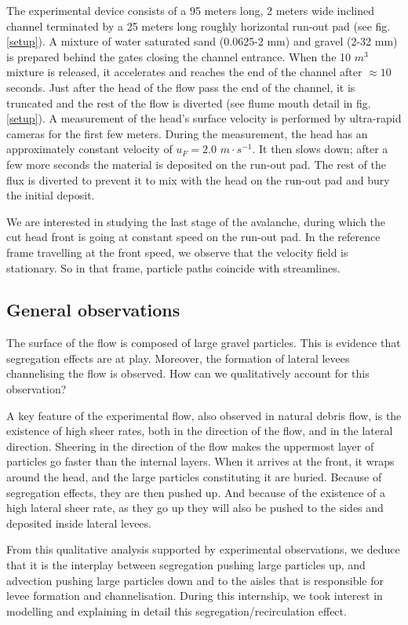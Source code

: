 The experimental device consists of a 95 meters long, 2 meters wide inclined channel terminated by a 25 meters long roughly horizontal run-out pad (see fig. \ref{setup}).
A mixture of water saturated sand (0.0625-2 mm) and gravel (2-32 mm) is prepared behind the gates closing the channel entrance.
When the 10 $m^3$ mixture is released, it accelerates and reaches the end of the channel after $\approx 10$ seconds. 
Just after the head of the flow pass the end of the channel, it is truncated and the rest of the flow is diverted (see flume mouth detail in fig. \ref{setup}).
A measurement of the head's surface velocity is performed by ultra-rapid cameras for the first few meters. During the measurement, the head has an approximately constant velocity of $u_F = 2.0$ $m \cdot s^{-1}$. It then slows down; after a few more seconds the material is deposited on the run-out pad.
The rest of the flux is diverted to prevent it to mix with the head on the run-out pad and bury the initial deposit. 

We are interested in studying the last stage of the avalanche, during which the cut head front is going at constant speed on the run-out pad.
In the reference frame travelling at the front speed, we observe that the velocity field is stationary. So in that frame, particle paths coincide with streamlines.

\subsection{General observations}

The surface of the flow is composed of large gravel particles. This is evidence that segregation effects are at play.
Moreover, the formation of lateral levees channelising the flow  is observed. How can we qualitatively account for this observation?

A key feature of the experimental flow, also observed in natural debris flow, is the existence of high sheer rates, both in the direction of the flow, and in the lateral direction.
Sheering in the direction of the flow makes the uppermost layer of particles go faster than the internal layers. When it arrives at the front, it wraps around the head, and the large particles constituting it are buried. 
Because of segregation effects, they are then pushed up. And because of the existence of a high lateral sheer rate, as they go up they will also be pushed to the sides and deposited inside lateral levees.

From this qualitative analysis supported by experimental observations, we deduce that it is the interplay between segregation pushing large particles up, and advection pushing large particles down and to the aisles that is responsible for levee formation and channelisation.
During this internship, we took interest in modelling and explaining in detail this segregation/recirculation effect.

